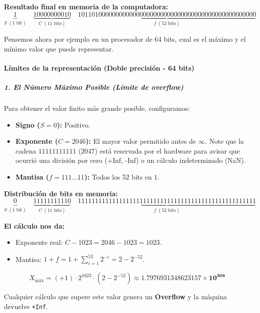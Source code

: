 \documentclass[12pt]{article}
\begin{document}
\noindent \textbf{Resultado final en memoria de la computadora:}
\[
\underbrace{1}_{S \; (1\text{ bit})} \quad \underbrace{10000000010}_{C \; (11\text{ bits})} \quad \underbrace{1011010000000000000000000000000000000000000000000000}_{f \; (52\text{ bits})}
\]


Pensemos ahora por ejemplo en un procesador de 64 bits, cual es el máximo  y el mínimo valor 
que puede representar. 

\paragraph{Límites de la representación (Doble precisión - 64 bits)}

\subparagraph{1. El Número Máximo Posible (Límite de overflow)}
Para obtener el valor finito más grande posible, configuramos:
\begin{itemize}
    \item \textbf{Signo ($S = 0$):} Positivo.
    \item \textbf{Exponente ($C = 2046$):} El mayor valor permitido antes de $\infty$.
    Note que la cadena $11111111111$ ($2047$) está reservada por el hardware para avisar que 
    ocurrió una división por cero (+Inf, -Inf) o un cálculo indeterminado (NaN).
    \item \textbf{Mantisa ($f = 111\dots11$):} Todos los 52 bits en $1$.
\end{itemize}

\noindent \textbf{Distribución de bits en memoria:}
\[
\underbrace{0}_{S \; (1\text{ bit})} \quad \underbrace{11111111110}_{C \; (11\text{ bits})} \quad \underbrace{1111111111111111111111111111111111111111111111111111}_{f \; (52\text{ bits})}
\]

\noindent \textbf{El cálculo nos da:}
\begin{itemize}
    \item Exponente real: $C - 1023 = 2046 - 1023 = 1023$.
    \item Mantisa: $1 + f = 1 + \sum_{i=1}^{52} 2^{-i} = 2 - 2^{-52}$.
\end{itemize}

\[
X_{\text{máx}} = (+1) \cdot 2^{1023} \cdot \left( 2 - 2^{-52} \right) \approx \mathbf{1.7976931348623157 \times 10^{308}}
\]

\noindent Cualquier cálculo que supere este valor genera un \textbf{Overflow} y la 
máquina devuelve \texttt{+Inf}.

\vspace{1em}
\end{document}
